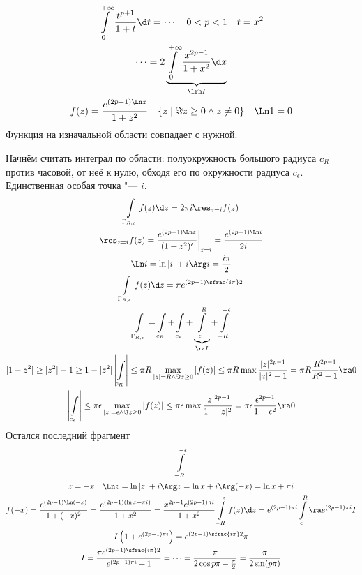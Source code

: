 \begin{exmp}
	\begin{gather*}
		\int\limits_{0}^{+\infty} \frac{t^{p+1}}{1+t}\d t = \cdots \quad 0 < p < 1 \quad t = x^2 \\
		\cdots = 2\underbrace{\int\limits_{0}^{+\infty} \frac{x^{2p-1}}{1+x^2} \d x}_{\lrh I} \\
		f(z) = \frac{e^{(2p-1)\Ln z}}{1+z^2} \quad \{z \mid \Im z \ge 0 \land z \ne 0\} \quad \Ln 1 = 0
	\end{gather*}
	Функция на изначальной области совпадает с нужной.

	Начнём считать интеграл по области: полуокружность большого радиуса $c_R$ против часовой, от неё к нулю,
	обходя его по окружности радиуса $c_{\epsilon}$.
	Единственная особая точка "--- $i$.
	\begin{gather*}
		\int\limits_{\Gamma_{R,\epsilon}} f(z) \d z = 2\pi i \res_{z=i} f(z) \\
		\res_{z=i} f(z)
		= \frac{e^{(2p-1)\Ln z}}{(1+z^2)'}\biggr|_{z=i}
		= \frac{e^{(2p-1)\Ln i}}{2i} \\
		\Ln i = \ln |i| + i \Arg i = \frac{i\pi}2 \\
		\int\limits_{\Gamma_{R,\epsilon}} f(z)\d z = \pi e^{(2p-1)\sfrac{i\pi}2} \\
		\int\limits_{\Gamma_{R,\epsilon}}
		= \int\limits_{c_R} + \int\limits_{c_\epsilon} + \underbrace{\int\limits_{\epsilon}^R}_{\ra I} + \int\limits_{-R}^{-\epsilon} \\
		|1 - z^2| \ge |z^2| - 1 \ge 1 - |z^2|
		\left| \int\limits_{c_R} \right|
		\le \pi R \max_{|z| = R \land \Im z \ge 0} |f(z)|
		\le \pi R \max \frac{|z|^{2p-1}}{|z|^2 - 1}
		= \pi R \frac{R^{2p-1}}{R^2 - 1} \ra 0 \\
		\left| \int\limits_{c_\epsilon} \right|
		\le \pi \epsilon \max_{|z| = \epsilon \land \Im z \ge 0} |f(z)|
		\le \pi \epsilon \max \frac{|z|^{2p-1}}{1 - |z|^2}
		= \pi \epsilon \frac{\epsilon^{2p-1}}{1 - \epsilon^2} \ra 0
	\end{gather*}
	Остался последний фрагмент
	\begin{gather*}
		\int\limits_{-R}^{-\epsilon} \\
		z = -x \quad \Ln z = \ln |z| + i\Arg z = \ln x + i \Arg (-x) = \ln x + \pi i \\
		f(-x)
		= \frac{e^{(2p-1)\Ln (-x)}}{1+(-x)^2}
		= \frac{e^{(2p-1)(\ln x + \pi i)}}{1+x^2}
		= \frac{x^{2p-1}e^{(2p-1)\pi i}}{1+x^2}
		\int\limits_{-R}^{\epsilon} f(z) \d z = e^{(2p-1)\pi i}\int\limits_{\epsilon}^R \ra e^{(2p-1)\pi i} I \\
		I \left(1 + e^{(2p-1)\pi i}\right) = e^{(2p-1)\sfrac{i\pi}2}\pi \\
		I = \frac{\pi e^{(2p-1)\sfrac{i\pi}2}}{e^{(2p-1)\pi i} + 1}
		= \dots = \frac{\pi}{2\cos{p\pi - \frac{\pi}2}}
		= \frac{\pi}{2\sin(p\pi)}
	\end{gather*}
\end{exmp}

